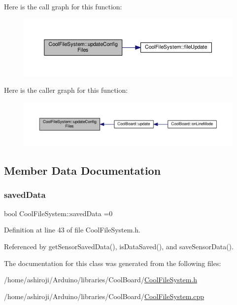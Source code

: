 Here is the call graph for this function\+:\nopagebreak
\begin{figure}[H]
\begin{center}
\leavevmode
\includegraphics[width=350pt]{classCoolFileSystem_adfa8e2e80641ae6f0cceabd348a9b841_cgraph}
\end{center}
\end{figure}
Here is the caller graph for this function\+:\nopagebreak
\begin{figure}[H]
\begin{center}
\leavevmode
\includegraphics[width=350pt]{classCoolFileSystem_adfa8e2e80641ae6f0cceabd348a9b841_icgraph}
\end{center}
\end{figure}


\subsection{Member Data Documentation}
\mbox{\label{classCoolFileSystem_ad398e0c5c41a0c88acdf5d672aa71351}} 
\subsubsection{\texorpdfstring{saved\+Data}{savedData}}
{\footnotesize\ttfamily bool Cool\+File\+System\+::saved\+Data =0\hspace{0.3cm}{\ttfamily [private]}}



Definition at line 43 of file Cool\+File\+System.\+h.



Referenced by get\+Sensor\+Saved\+Data(), is\+Data\+Saved(), and save\+Sensor\+Data().



The documentation for this class was generated from the following files\+:\begin{DoxyCompactItemize}
\item 
/home/ashiroji/\+Arduino/libraries/\+Cool\+Board/\hyperlink{CoolFileSystem_8h}{Cool\+File\+System.\+h}\item 
/home/ashiroji/\+Arduino/libraries/\+Cool\+Board/\hyperlink{CoolFileSystem_8cpp}{Cool\+File\+System.\+cpp}\end{DoxyCompactItemize}
